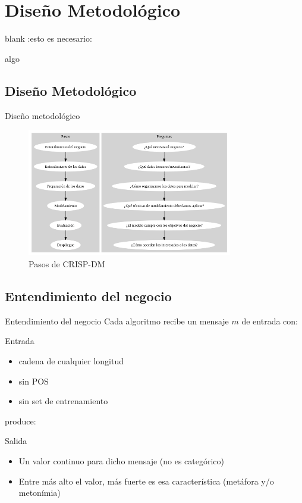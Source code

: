 \documentclass[presentation]{beamer}
\begin{document}
\section{Diseño Metodológico}
\label{sec:orga19a4c2}
\begin{frame}[label={sec:org06b6b45}]{blank :esto es necesario:}
\begin{block}{algo}
\end{block}
\end{frame}
\subsection{Diseño Metodológico}
\label{sec:org7f2ef40}
\begin{frame}[label={sec:orgf7f2d84}]{Diseño metodológico}
\begin{figure}
 \includegraphics[width=0.8\textwidth]{./assets/metodologia.png}
 \caption{Pasos de CRISP-DM}
 \end{figure}
\end{frame}

\subsection{Entendimiento del negocio}
\label{sec:orgb8f1332}
\begin{frame}[label={sec:orgc05f67d}]{Entendimiento del negocio}
Cada algoritmo recibe un mensaje  \(m\) de entrada con:
\begin{block}{Entrada}
\begin{itemize}
\item cadena de cualquier longitud
\item sin POS
\item sin set de entrenamiento
\end{itemize}
\end{block}
produce:

\begin{block}{Salida}
\begin{itemize}
\item  Un valor continuo para dicho mensaje (no es categórico)
\item  Entre más alto el valor, más fuerte es esa característica (metáfora y/o metonímia)
\end{itemize}
\end{block}
\end{frame}
\end{document}
